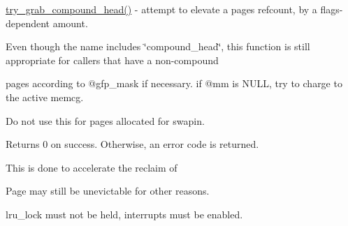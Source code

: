 \mbox{\hyperlink{gup_8c_aa4595a7163e71ca3648e5b04b50fc732}{try\+\_\+grab\+\_\+compound\+\_\+head()}} -\/ attempt to elevate a page\textquotesingle{}s refcount, by a flags-\/dependent amount.

Even though the name includes \char`\"{}compound\+\_\+head\char`\"{}, this function is still appropriate for callers that have a non-\/compound

pages according to @gfp\+\_\+mask if necessary. if @mm is N\+U\+LL, try to charge to the active memcg.

Do not use this for pages allocated for swapin.

Returns 0 on success. Otherwise, an error code is returned.

This is done to accelerate the reclaim of

Page may still be unevictable for other reasons.

lru\+\_\+lock must not be held, interrupts must be enabled. 
